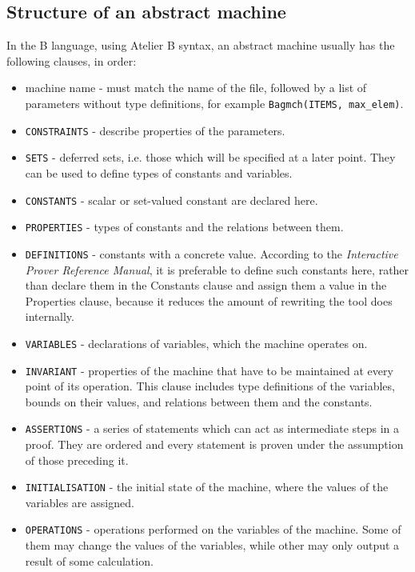 \documentclass[12pt,journal,duplex]{IEEEtran}
\begin{document}
	\subsection{Structure of an abstract machine}
	In the B language, using Atelier B syntax, an abstract machine usually has the following clauses, in order:
	\begin{itemize}
		\item machine name - must match the name of the file, followed by a list of parameters without type definitions, for example \texttt{Bagmch(ITEMS, max\_elem)}.
		\item \texttt{CONSTRAINTS} - describe properties of the parameters.
		\item \texttt{SETS} - deferred sets, i.e. those which will be specified at a later point. They can be used to define types of constants and variables.
		\item \texttt{CONSTANTS} - scalar or set-valued constant are declared here.
		\item \texttt{PROPERTIES} - types of constants and the relations between them.
		\item \texttt{DEFINITIONS} - constants with a concrete value. According to the \emph{Interactive Prover Reference Manual}, it is preferable to define such constants here, rather than declare them in the Constants clause and assign them a value in the Properties clause, because it reduces the amount of rewriting the tool does internally.
		\item \texttt{VARIABLES} - declarations of variables, which the machine operates on.
		\item \texttt{INVARIANT} - properties of the machine that have to be maintained at every point of its operation. This clause includes type definitions of the variables, bounds on their values, and relations between them and the constants.
		\item \texttt{ASSERTIONS} - a series of statements which can act as intermediate steps in a proof. They are ordered and every statement is proven under the assumption of those preceding it.
		\item \texttt{INITIALISATION} - the initial state of the machine, where the values of the variables are assigned.
		\item \texttt{OPERATIONS} - operations performed on the variables of the machine. Some of them may change the values of the variables, while other may only output a result of some calculation.
	\end{itemize}
\end{document}
